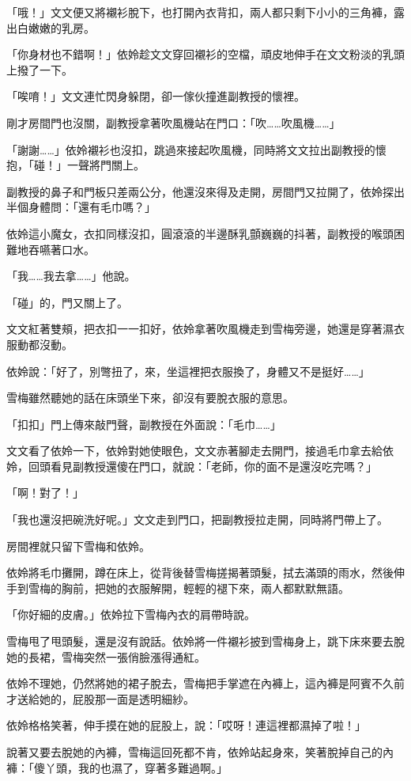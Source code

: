 「哦！」文文便又將襯衫脫下，也打開內衣背扣，兩人都只剩下小小的三角褲，露出白嫩嫩的乳房。

「你身材也不錯啊！」依姈趁文文穿回襯衫的空檔，頑皮地伸手在文文粉淡的乳頭上撥了一下。

「唉唷！」文文連忙閃身躲閉，卻一傢伙撞進副教授的懷裡。

剛才房間門也沒關，副教授拿著吹風機站在門口：「吹……吹風機……」

「謝謝……」依姈襯衫也沒扣，跳過來接起吹風機，同時將文文拉出副教授的懷抱，「碰！」一聲將門關上。

副教授的鼻子和門板只差兩公分，他還沒來得及走開，房間門又拉開了，依姈探出半個身體問：「還有毛巾嗎？」

依姈這小魔女，衣扣同樣沒扣，圓滾滾的半邊酥乳顫巍巍的抖著，副教授的喉頭困難地吞嚥著口水。

「我……我去拿……」他說。

「碰」的，門又關上了。

文文紅著雙頰，把衣扣一一扣好，依姈拿著吹風機走到雪梅旁邊，她還是穿著濕衣服動都沒動。

依姈說：「好了，別彆扭了，來，坐這裡把衣服換了，身體又不是挺好……」

雪梅雖然聽她的話在床頭坐下來，卻沒有要脫衣服的意思。

「扣扣」門上傳來敲門聲，副教授在外面說：「毛巾……」

文文看了依姈一下，依姈對她使眼色，文文赤著腳走去開門，接過毛巾拿去給依姈，回頭看見副教授還傻在門口，就說：「老師，你的面不是還沒吃完嗎？」

「啊！對了！」

「我也還沒把碗洗好呢。」文文走到門口，把副教授拉走開，同時將門帶上了。

房間裡就只留下雪梅和依姈。

依姈將毛巾攤開，蹲在床上，從背後替雪梅搓揭著頭髮，拭去滿頭的雨水，然後伸手到雪梅的胸前，把她的衣服解開，輕輕的褪下來，兩人都默默無語。

「你好細的皮膚。」依姈拉下雪梅內衣的肩帶時說。

雪梅甩了甩頭髮，還是沒有說話。依姈將一件襯衫披到雪梅身上，跳下床來要去脫她的長裙，雪梅突然一張俏臉漲得通紅。

依姈不理她，仍然將她的裙子脫去，雪梅把手掌遮在內褲上，這內褲是阿賓不久前才送給她的，屁股那一面是透明細紗。

依姈格格笑著，伸手摸在她的屁股上，說：「哎呀！連這裡都濕掉了啦！」

說著又要去脫她的內褲，雪梅這回死都不肯，依姈站起身來，笑著脫掉自己的內褲：「傻丫頭，我的也濕了，穿著多難過啊。」

